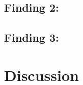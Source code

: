 \subsection{Finding 2:}
\subsection{Finding 3:}

\section{Discussion}

\clearpage 
\printbibliography


